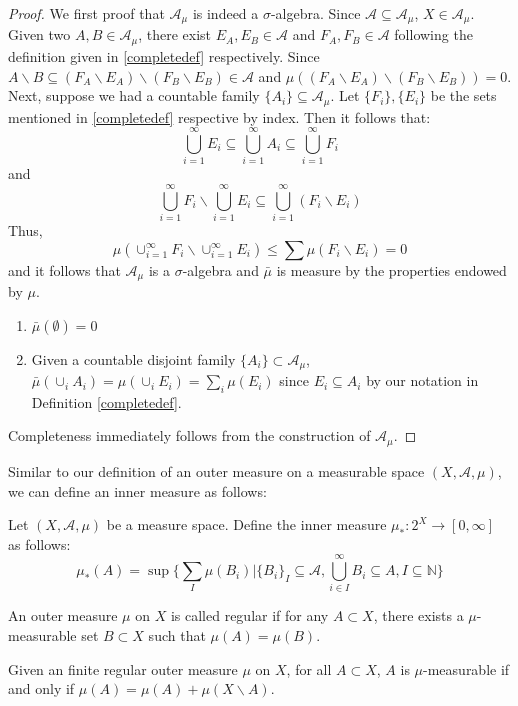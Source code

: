 \documentclass[main.tex]{subfiles}
\begin{document}
\begin{proof}
We first proof that $\mathcal{A}_{\mu}$ is indeed a $\sigma$-algebra. Since $\mathcal{A} \subseteq \mathcal{A}_{\mu}$, $X \in \mathcal{A}_{\mu}$. Given two $A,B \in \mathcal{A}_{\mu}$, there exist $E_A,E_B \in \mathcal{A}$ and $F_A,F_B \in \mathcal{A}$ following the definition given in \ref{completedef} respectively. Since $A\backslash B \subseteq (F_A \backslash E_A) \backslash (F_B \backslash E_B) \in \mathcal{A}$ and $\mu((F_A \backslash E_A) \backslash (F_B \backslash E_B)) = 0$. Next, suppose we had a countable family $\{A_i\} \subseteq  \mathcal{A}_{\mu}$.
Let $\{F_i\},\{E_i\}$ be the sets mentioned in \ref{completedef} respective by index. Then it follows that: 
$$ \bigcup_{i = 1}^{\infty} E_i \subseteq \bigcup_{i = 1}^{\infty} A_i\subseteq \bigcup_{i = 1}^{\infty} F_i$$ and 
$$\bigcup_{i = 1}^{\infty} F_i \backslash  \bigcup_{i = 1}^{\infty} E_i \subseteq \bigcup_{i = 1}^{\infty} (F_i \backslash E_i) $$ 
Thus,
$$ \mu(\cup_{i = 1}^{\infty} F_i \backslash  \cup_{i = 1}^{\infty} E_i ) \leq \sum \mu(F_i\backslash E_i) = 0 $$
and it follows that $\mathcal{A}_{\mu}$ is a $\sigma$-algebra and $\bar{\mu}$ is measure by the properties endowed by $\mu$. 

\begin{enumerate}
 \item $\bar{\mu}(\emptyset) = 0$
 \item Given a countable disjoint family $\{A_i\} \subset \mathcal{A}_{\mu}$,
 $\bar{\mu}(\cup_i A_i) = \mu(\cup_i E_i) = \sum_i \mu(E_i)$ since $E_i \subseteq A_i$ by our notation in Definition \ref{completedef}.
\end{enumerate}

Completeness immediately follows from the construction of $\mathcal{A}_{\mu}$.
\end{proof}

Similar to our definition of an outer measure on a measurable space $(X,\mathcal{A},\mu)$, we can define an inner measure as follows:

\begin{definition}
 Let $(X,\mathcal{A},\mu)$ be a measure space. Define the inner measure 
 $\mu_*: 2^X \rightarrow [0,\infty]$ as follows:
 $$ \mu_*(A) = \sup \{ \sum_I \mu(B_i) \vert \{B_i\}_I \subseteq \mathcal{A}, \bigcup_{i \in I}^{\infty} B_i \subseteq A, I \subseteq \mathbb{N} \}$$
\end{definition}


\begin{definition}
An outer measure $\mu$ on $X$ is called regular if for any $A \subset X$, there exists a $\mu$-measurable set $B \subset X$ such that $\mu(A) = \mu(B)$. 
\end{definition} 

\begin{theorem}
Given an finite regular outer measure $\mu$ on $X$, for all $A \subset X$, $A$ is $\mu$-measurable if and only if $\mu(A) = \mu(A) + \mu(X \backslash A)$. 
\end{theorem}
\end{document}
